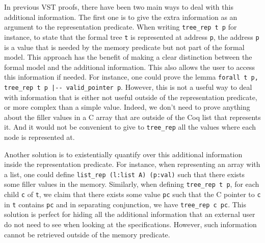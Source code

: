 In previous VST proofs, there have been two main ways to deal with this additional information.
The first one is to give the extra information as an argument to the representation predicate.
When writing \lstinline[language=Coq]{tree_rep t p} for instance, to state that the formal tree \texttt{t} is represented at address \texttt{p}, the address \texttt{p} is a value that is needed by the memory predicate but not part of the formal model.
This approach has the benefit of making a clear distinction between the formal model and the additional information.
This also allows the user to access this information if needed.
For instance, one could prove the lemma \lstinline[language=Coq]{forall t p, tree_rep t p |-- valid_pointer p}.
However, this is not a useful way to deal with information that is either not useful outside of the representation predicate, or more complex than a simple value.
Indeed, we don't need to prove anything about the filler  values in a C array that are outside of the Coq list that represents it.
And it would not be convenient to give to \lstinline{tree_rep} all the values where each node is represented at.

Another solution is to existentially quantify over this additional information inside the representation predicate.
For instance, when representing an array with a list, one could define \lstinline{list_rep (l:list A) (p:val)} such that there exists some filler values in the memory.
Similarly, when defining \lstinline{tree_rep t p}, for each child \texttt{c} of \texttt{t}, we claim that there exists some value \texttt{pc} such that the C pointer to \texttt{c} in \texttt{t} contains \texttt{pc} and in separating conjunction, we have \lstinline{tree_rep c pc}.
This solution is perfect for hiding all the additional information that an external user do not need to see when looking at the specifications.
However, such information cannot be retrieved outside of the memory predicate.

